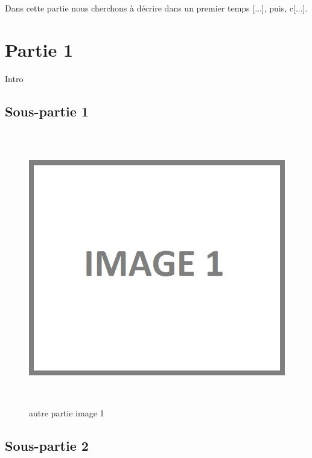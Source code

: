 \iffalse
Dans cette partie nous cherchons à décrire dans un premier temps [...], puis, c[...].

\section{Partie 1}

Intro

\subsection{Sous-partie 1}

\begin{figure}[!ht]
\begin{center}
\includegraphics[height=12cm]{autre_partie/image1}
\end{center}
\caption[autre partie générale]{autre partie image 1\protect\footnotemark}
\end{figure}


\newpage{}

\subsection{Sous-partie 2}

